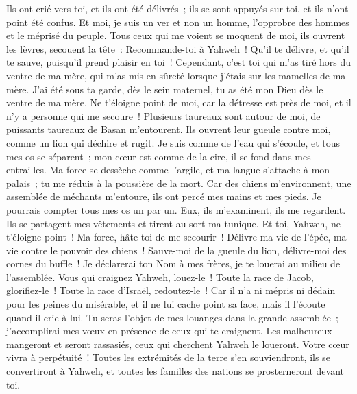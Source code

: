 \begin{multicols}{2}
Ils ont crié vers toi, et ils ont été délivrés~; ils se sont appuyés sur toi, et ils n'ont point été confus.
Et moi, je suis un ver et non un homme, l'opprobre des hommes et le méprisé du peuple.
Tous ceux qui me voient se moquent de moi, ils ouvrent les lèvres, secouent la tête~:
Recommande-toi à Yahweh~! Qu'il te délivre, et qu'il te sauve, puisqu'il prend plaisir en toi~!
Cependant, c'est toi qui m'as tiré hors du ventre de ma mère, qui m'as mis en sûreté lorsque j'étais sur les mamelles de ma mère.
J'ai été sous ta garde, dès le sein maternel, tu as été mon Dieu dès le ventre de ma mère.
Ne t'éloigne point de moi, car la détresse est près de moi, et il n'y a personne qui me secoure~!
Plusieurs taureaux sont autour de moi, de puissants taureaux de Basan m'entourent.
Ils ouvrent leur gueule contre moi, comme un lion qui déchire et rugit.
Je suis comme de l'eau qui s'écoule, et tous mes os se séparent~; mon cœur est comme de la cire, il se fond dans mes entrailles.
Ma force se dessèche comme l'argile, et ma langue s'attache à mon palais~; tu me réduis à la poussière de la mort.
Car des chiens m'environnent, une assemblée de méchants m'entoure, ils ont percé mes mains et mes pieds.
Je pourrais compter tous mes os un par un. Eux, ils m'examinent, ils me regardent.
Ils se partagent mes vêtements et tirent au sort ma tunique.
Et toi, Yahweh, ne t'éloigne point~! Ma force, hâte-toi de me secourir~!
Délivre ma vie de l'épée, ma vie contre le pouvoir des chiens~!
Sauve-moi de la gueule du lion, délivre-moi des cornes du buffle~!
Je déclarerai ton Nom à mes frères, je te louerai au milieu de l'assemblée.
Vous qui craignez Yahweh, louez-le~! Toute la race de Jacob, glorifiez-le~! Toute la race d'Israël, redoutez-le~!
Car il n'a ni mépris ni dédain pour les peines du misérable, et il ne lui cache point sa face, mais il l'écoute quand il crie à lui.
Tu seras l'objet de mes louanges dans la grande assemblée~; j'accomplirai mes vœux en présence de ceux qui te craignent.
Les malheureux mangeront et seront rassasiés, ceux qui cherchent Yahweh le loueront. Votre cœur vivra à perpétuité~!
Toutes les extrémités de la terre s'en souviendront, ils se convertiront à Yahweh, et toutes les familles des nations se prosterneront devant toi.

\end{multicols}
